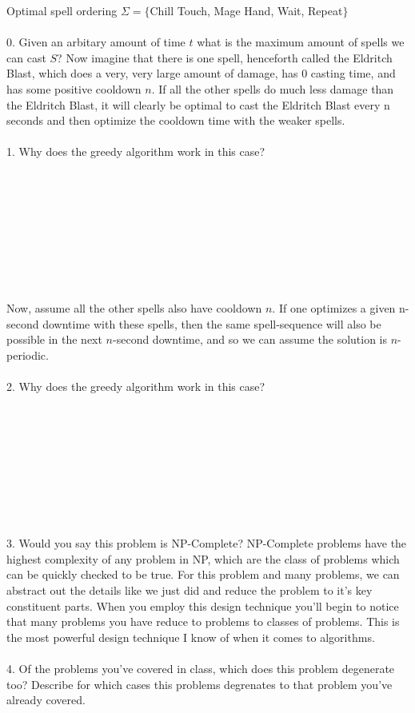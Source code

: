 \documentclass[12pt]{article}
\begin{document}
Optimal spell ordering $\Sigma =\{$Chill Touch, Mage Hand, Wait, Repeat$\}$\\\\
0. Given an arbitary amount of time $t$ what is the maximum amount of spells
we can cast $S$?
\newpage
\noindent Now imagine that there is one spell, henceforth called the Eldritch Blast, 
which does a very, very large amount of damage, has $0$ casting time, and has 
some positive cooldown $n$. If all the other spells do much less damage than the 
Eldritch Blast, it will clearly be optimal to cast the Eldritch Blast every n seconds and 
then optimize the cooldown time with the weaker spells.\\\\
1. Why does the greedy algorithm work in this case?\\\\\\\\\\\\\\\\\\\\
Now, assume all the other spells also have cooldown $n$. 
If one optimizes a given n-second downtime with these spells, 
then the same spell-sequence will also be possible in the next 
$n$-second downtime, and so we can assume the solution is $n$-periodic.\\\\
2. Why does the greedy algorithm work in this case?\\\\\\\\\\\\\\\\\\\\
3. Would you say this problem is NP-Complete? NP-Complete problems have the 
highest complexity of any problem in NP, which are the class of problems which can
be quickly checked to be true.
\newpage
\noindent For this problem and many problems, we can abstract out the details like we just did
and reduce the problem to it's key constituent parts. When you employ this
design technique you'll begin to notice that many problems you have reduce to problems
to classes of problems. This is the most powerful design technique I know of when it 
comes to algorithms.\\\\
4. Of the problems you've covered in class, which does this problem degenerate too? Describe for 
which cases this problems degrenates to that problem you've already covered.
\end{document}
